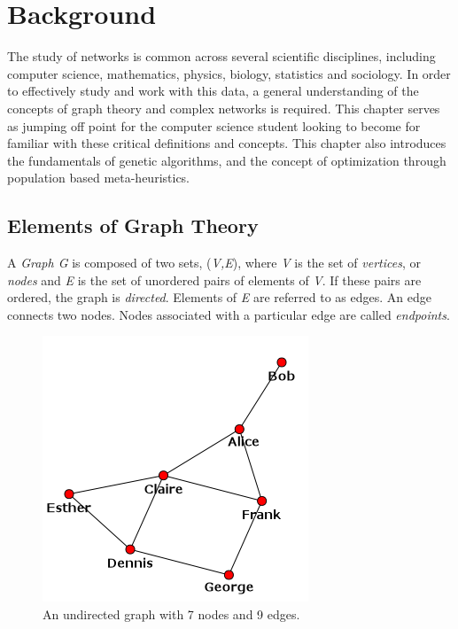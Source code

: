 \chapter{Background}

The study of networks is common across several scientific disciplines, including computer science, mathematics, physics, biology, statistics and sociology. In order to effectively study and work with this data, a general understanding of the concepts of graph theory and complex networks is required. This chapter serves as jumping off point for the computer science student looking to become for familiar with these critical definitions and concepts. This chapter also introduces the fundamentals of genetic algorithms, and the concept of optimization through population based meta-heuristics.

\label{system}
\section{Elements of Graph Theory}
A \textit{Graph G} is composed of two sets, (\textit{V,E}), where \textit{V} is the set of \textit{vertices}, or \textit{nodes} and \textit{E} is the set of unordered pairs of elements of \textit{V}. If these pairs are ordered, the graph is \textit{directed}. Elements of \textit{E} are referred to as edges. An edge connects two nodes. Nodes associated with a particular edge are called \textit{endpoints}. 
\begin{figure}[!h]
	\begin{center}
		\includegraphics[scale=0.5]{images/simple_graph.png}
	\end{center}
	\caption{An undirected graph with 7 nodes and 9 edges.}
	\label{logo}
\end{figure}

